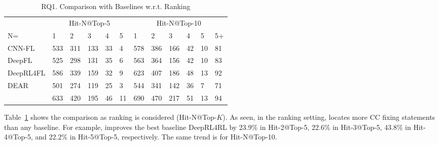 \begin{table}[t]
  \caption{RQ1. Comparison with Baselines w.r.t. Ranking}
  \tabcolsep 4.8pt
        \vspace{-9pt}
	{\small
		\begin{center}
			\renewcommand{\arraystretch}{1}
			\begin{tabular}{p{1.3cm}<{\centering}|p{0.3cm}<{\centering}|p{0.3cm}<{\centering}|p{0.3cm}<{\centering}|p{0.2cm}<{\centering}|p{0.2cm}<{\centering}||p{0.3cm}<{\centering}|p{0.3cm}<{\centering}|p{0.3cm}<{\centering}|p{0.2cm}<{\centering}|p{0.2cm}<{\centering}|p{0.2cm}<{\centering}}
				\hline
				    & \multicolumn{5}{c||}{Hit-N@Top-5}& \multicolumn{6}{c}{Hit-N@Top-10}\\
				\cline{2-12} N= 
											 &1&2&3&4&5&1&2&3&4&5&5+\\
				
				\hline
				CNN-FL      & 533 & 311 & 133 & 33 & 4 & 578 & 386 & 166 & 42 & 10 & 81 \\
				DeepFL		& 525 & 298 & 131 & 35 & 6 & 563 & 364 & 156 & 42 & 10 & 83 \\
				DeepRL4FL	& 586 & 339 & 159 & 32 & 9 & 623 & 407 & 186 & 48 & 13 & 92 \\
                                DEAR	& 501 & 274 & 119 & 25 & 3 & 544 & 341 & 142 & 36 & 7 & 71 \\
				\hline
				\tool       & 633 & 420 & 195 & 46 & 11& 690 & 470 & 217 & 51 & 13 & 94 \\
				\hline
			\end{tabular}
			
			\label{fig:rq1-rank}
		\end{center}
	}
\end{table}

Table~\ref{fig:rq1-rank} shows the comparison as ranking is considered
(Hit-N@Top-$K$).  As seen,
in the ranking setting, {\tool} locates more CC fixing
statements than any baseline.
For example, {\tool} improves the best baseline DeepRL4RL
by 23.9\% in Hit-2@Top-5, 22.6\% in Hit-3@Top-5, 43.8\% in
Hit-4@Top-5, and 22.2\% in Hit-5@Top-5, respectively. The same trend
is for Hit-N@Top-10.


